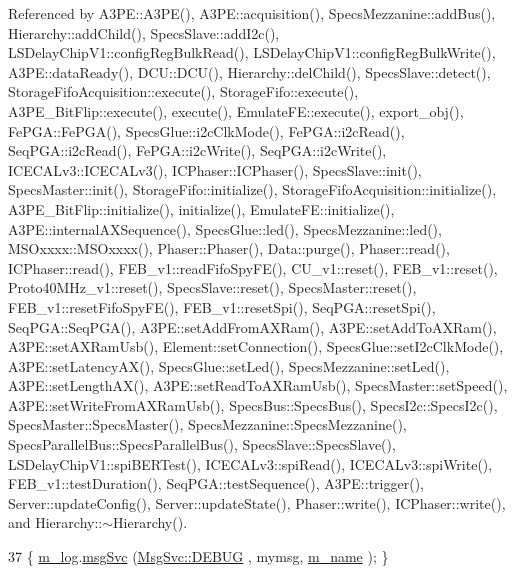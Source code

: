 Referenced by A3\+P\+E\+::\+A3\+P\+E(), A3\+P\+E\+::acquisition(), Specs\+Mezzanine\+::add\+Bus(), Hierarchy\+::add\+Child(), Specs\+Slave\+::add\+I2c(), L\+S\+Delay\+Chip\+V1\+::config\+Reg\+Bulk\+Read(), L\+S\+Delay\+Chip\+V1\+::config\+Reg\+Bulk\+Write(), A3\+P\+E\+::data\+Ready(), D\+C\+U\+::\+D\+C\+U(), Hierarchy\+::del\+Child(), Specs\+Slave\+::detect(), Storage\+Fifo\+Acquisition\+::execute(), Storage\+Fifo\+::execute(), A3\+P\+E\+\_\+\+Bit\+Flip\+::execute(), execute(), Emulate\+F\+E\+::execute(), export\+\_\+obj(), Fe\+P\+G\+A\+::\+Fe\+P\+G\+A(), Specs\+Glue\+::i2c\+Clk\+Mode(), Fe\+P\+G\+A\+::i2c\+Read(), Seq\+P\+G\+A\+::i2c\+Read(), Fe\+P\+G\+A\+::i2c\+Write(), Seq\+P\+G\+A\+::i2c\+Write(), I\+C\+E\+C\+A\+Lv3\+::\+I\+C\+E\+C\+A\+Lv3(), I\+C\+Phaser\+::\+I\+C\+Phaser(), Specs\+Slave\+::init(), Specs\+Master\+::init(), Storage\+Fifo\+::initialize(), Storage\+Fifo\+Acquisition\+::initialize(), A3\+P\+E\+\_\+\+Bit\+Flip\+::initialize(), initialize(), Emulate\+F\+E\+::initialize(), A3\+P\+E\+::internal\+A\+X\+Sequence(), Specs\+Glue\+::led(), Specs\+Mezzanine\+::led(), M\+S\+Oxxxx\+::\+M\+S\+Oxxxx(), Phaser\+::\+Phaser(), Data\+::purge(), Phaser\+::read(), I\+C\+Phaser\+::read(), F\+E\+B\+\_\+v1\+::read\+Fifo\+Spy\+F\+E(), C\+U\+\_\+v1\+::reset(), F\+E\+B\+\_\+v1\+::reset(), Proto40\+M\+Hz\+\_\+v1\+::reset(), Specs\+Slave\+::reset(), Specs\+Master\+::reset(), F\+E\+B\+\_\+v1\+::reset\+Fifo\+Spy\+F\+E(), F\+E\+B\+\_\+v1\+::reset\+Spi(), Seq\+P\+G\+A\+::reset\+Spi(), Seq\+P\+G\+A\+::\+Seq\+P\+G\+A(), A3\+P\+E\+::set\+Add\+From\+A\+X\+Ram(), A3\+P\+E\+::set\+Add\+To\+A\+X\+Ram(), A3\+P\+E\+::set\+A\+X\+Ram\+Usb(), Element\+::set\+Connection(), Specs\+Glue\+::set\+I2c\+Clk\+Mode(), A3\+P\+E\+::set\+Latency\+A\+X(), Specs\+Glue\+::set\+Led(), Specs\+Mezzanine\+::set\+Led(), A3\+P\+E\+::set\+Length\+A\+X(), A3\+P\+E\+::set\+Read\+To\+A\+X\+Ram\+Usb(), Specs\+Master\+::set\+Speed(), A3\+P\+E\+::set\+Write\+From\+A\+X\+Ram\+Usb(), Specs\+Bus\+::\+Specs\+Bus(), Specs\+I2c\+::\+Specs\+I2c(), Specs\+Master\+::\+Specs\+Master(), Specs\+Mezzanine\+::\+Specs\+Mezzanine(), Specs\+Parallel\+Bus\+::\+Specs\+Parallel\+Bus(), Specs\+Slave\+::\+Specs\+Slave(), L\+S\+Delay\+Chip\+V1\+::spi\+B\+E\+R\+Test(), I\+C\+E\+C\+A\+Lv3\+::spi\+Read(), I\+C\+E\+C\+A\+Lv3\+::spi\+Write(), F\+E\+B\+\_\+v1\+::test\+Duration(), Seq\+P\+G\+A\+::test\+Sequence(), A3\+P\+E\+::trigger(), Server\+::update\+Config(), Server\+::update\+State(), Phaser\+::write(), I\+C\+Phaser\+::write(), and Hierarchy\+::$\sim$\+Hierarchy().


\begin{DoxyCode}
37 \{ \hyperlink{classObject_a0d269813dd7ac1f24bc143031e2963f2}{m\_log}.\hyperlink{classMsgSvc_ad25f18047920cc59a314e5098259711c}{msgSvc} (\hyperlink{classMsgSvc_ae671eb7301996cd049d2da8a65925926a1dbdcc82dce88370ec335883c83b38b0}{MsgSvc::DEBUG}   , mymsg, \hyperlink{classObject_a8b83c95c705d2c3ba0d081fe1710f48d}{m\_name} ); \}
\end{DoxyCode}
\mbox{\label{classObject_a6c9a0397ca804e04d675ed05683f5420}} 
